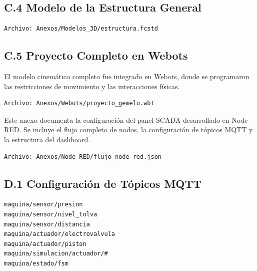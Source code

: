 \subsection*{C.4 Modelo de la Estructura General}

\begin{verbatim}
Archivo: Anexos/Modelos_3D/estructura.fcstd
\end{verbatim}

\subsection*{C.5 Proyecto Completo en Webots}

El modelo cinemático completo fue integrado en Webots, donde se programaron las restricciones de movimiento y las interacciones físicas.

\begin{verbatim}
Archivo: Anexos/Webots/proyecto_gemelo.wbt
\end{verbatim}



Este anexo documenta la configuración del panel SCADA desarrollado en Node-RED. Se incluye el flujo completo de nodos, la configuración de tópicos MQTT y la estructura del dashboard.

\begin{verbatim}
Archivo: Anexos/Node-RED/flujo_node-red.json
\end{verbatim}

\subsection*{D.1 Configuración de Tópicos MQTT}

\begin{verbatim}
maquina/sensor/presion
maquina/sensor/nivel_tolva
maquina/sensor/distancia
maquina/actuador/electrovalvula
maquina/actuador/piston
maquina/simulacion/actuador/#
maquina/estado/fsm
\end{verbatim}



